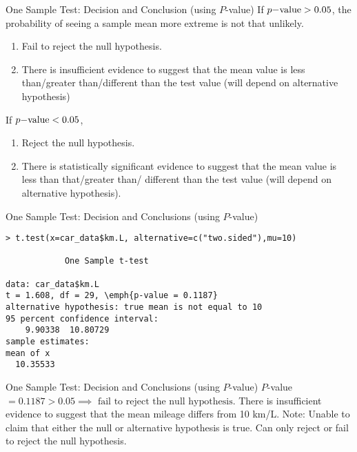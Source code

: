 \documentclass[xcolor=svgnames, 10pt, handout]{beamer}
\begin{document}
\begin{frame}[fragile]{One Sample Test: Decision and Conclusion (using $P$-value)}
\vfill
If $p{\rm-value} > 0.05$, the probability of seeing a sample mean more extreme is not that unlikely.
\begin{enumerate}
\item Fail to reject the null hypothesis.
\item There is insufficient  evidence to suggest that the mean value is less than/greater than/different than the test value (will depend on alternative hypothesis)
\end{enumerate}
\vfill
If $p{\rm-value} < 0.05$,
\begin{enumerate}
\item Reject the null hypothesis.
\item There is statistically significant evidence to suggest that the mean value is less than that/greater than/ different than the test value  (will depend on alternative hypothesis).
\end{enumerate}
\vfill
\end{frame}


\begin{frame}[fragile]{One Sample Test: Decision and Conclusions (using $P$-value)}
\begin{Verbatim}[xleftmargin=2em, xrightmargin=1.5em, frame=single, label=R code, framesep=0.5em, fontsize=\small, commandchars=\\\{\}]
> t.test(x=car_data$km.L, alternative=c("two.sided"),mu=10)
            
            One Sample t-test
            
data: car_data$km.L
t = 1.608, df = 29, \emph{p-value = 0.1187}
alternative hypothesis: true mean is not equal to 10
95 percent confidence interval:
    9.90338  10.80729
sample estimates:
mean of x
  10.35533
\end{Verbatim}
\end{frame}


\begin{frame}[fragile]{One Sample Test: Decision and Conclusions (using $P$-value)}
\vfill
$P$-value $=0.1187 > 0.05 \implies \text{ fail to reject the null hypothesis}$.
\vfill
There is insufficient evidence to suggest that the mean mileage differs from 10 km/L.
\vfill
Note: Unable to claim that either the null or alternative hypothesis is true.  Can only reject or fail to reject the null hypothesis.
\vfill
\end{frame}
\end{document}
